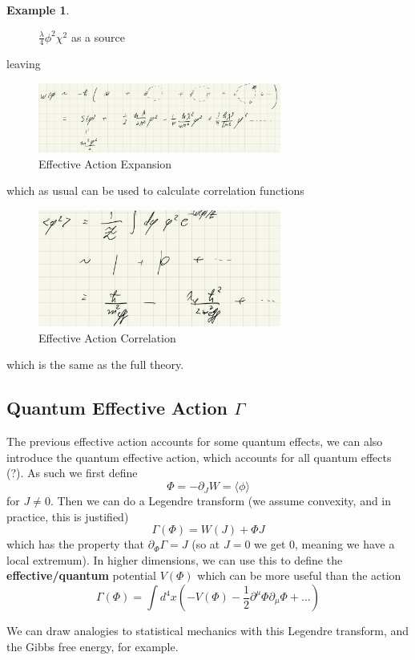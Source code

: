 \documentclass{article}
\theoremstyle{definition}
\newtheorem{example}{Example}
\begin{document}
\begin{example}
\begin{figure}[H]
    \caption{$\frac{\lambda}{4} \phi^2 \chi^2$ as a source}
    \label{lec_5_effective_source}
  \end{figure}
  leaving
  \begin{figure}[H]
    \centering
    \includegraphics[width=8cm]{res/AQFT/lec_5_effective_pertubation}
    \caption{Effective Action Expansion}
    \label{lec_5_effective_pertubation}
  \end{figure}
  which as usual can be used to calculate correlation functions
  \begin{figure}[H]
    \centering
    \includegraphics[width=8cm]{res/AQFT/lec_5_effective_correlation}
    \caption{Effective Action Correlation}
    \label{lec_5_effective_correlation}
  \end{figure}
  which is the same as the full theory.
\end{example}

\subsection{Quantum Effective Action $\Gamma$}

The previous effective action accounts for some quantum effects, we can also
introduce the quantum effective action, which accounts for all quantum effects
(?). As such we first define
\begin{equation}
  \Phi = -\partial_J W = \langle \phi \rangle
\end{equation}
for $J \neq 0$. Then we can do a Legendre transform (we assume convexity, and in
practice, this is justified)
\begin{equation}
  \Gamma(\Phi) = W(J) + \Phi J
\end{equation}
which has the property that $\partial_\Phi \Gamma = J$ (so at $J = 0$ we get
$0$, meaning we have a local extremum). In higher dimensions, we can use this to
define the \textbf{effective/quantum} potential $V(\Phi)$ which can be more useful than
the action
\begin{equation}
  \Gamma(\Phi) = \int d^4x \left( -V(\Phi)
    - \frac{1}{2} \partial^\mu \Phi \partial_\mu \Phi + \dots \right)
\end{equation}

We can draw analogies to statistical mechanics with this Legendre transform, and
the Gibbs free energy, for example.
\end{document}
